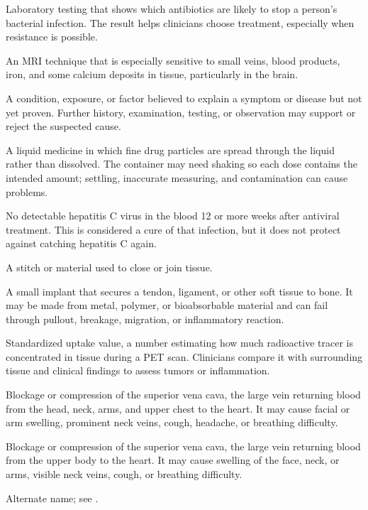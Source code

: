  Laboratory testing that shows which antibiotics are likely to stop a person’s bacterial infection. The result helps clinicians choose treatment, especially when resistance is possible.

 An MRI technique that is especially sensitive to small veins, blood products, iron, and some calcium deposits in tissue, particularly in the brain.

 A condition, exposure, or factor believed to explain a symptom or disease but not yet proven. Further history, examination, testing, or observation may support or reject the suspected cause.

 A liquid medicine in which fine drug particles are spread through the liquid rather than dissolved. The container may need shaking so each dose contains the intended amount; settling, inaccurate measuring, and contamination can cause problems.

 No detectable hepatitis C virus in the blood 12 or more weeks after antiviral treatment. This is considered a cure of that infection, but it does not protect against catching hepatitis C again.

 A stitch or material used to close or join tissue.

 A small implant that secures a tendon, ligament, or other soft tissue to bone. It may be
made from metal, polymer, or bioabsorbable material and can fail through pullout,
breakage, migration, or inflammatory reaction.

 Standardized uptake value, a number estimating how much radioactive tracer is concentrated in tissue during a PET scan. Clinicians compare it with surrounding tissue and clinical findings to assess tumors or inflammation.

 Blockage or compression of the superior vena cava, the large vein returning blood from the head, neck, arms, and upper chest to the heart. It may cause facial or arm swelling, prominent neck veins, cough, headache, or breathing difficulty.

 Blockage or compression of the superior vena cava, the large vein returning blood from the upper body to the heart. It may cause swelling of the face, neck, or arms, visible neck veins, cough, or breathing difficulty.

 Alternate name; see .


